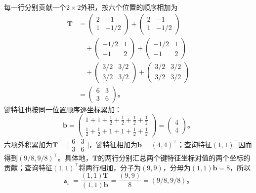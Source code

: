 每一行分别贡献一个$2\times2$外积，按六个位置的顺序相加为
\[
  \begin{aligned}
    \bm T
      &=\begin{pmatrix}2&-1\\1&-1/2\end{pmatrix}
        +\begin{pmatrix}2&-1\\1&-1/2\end{pmatrix}\\
      &\quad+\begin{pmatrix}-1/2&1\\-1&2\end{pmatrix}
        +\begin{pmatrix}-1/2&1\\-1&2\end{pmatrix}\\
      &\quad+\begin{pmatrix}3/2&3/2\\3/2&3/2\end{pmatrix}
        +\begin{pmatrix}3/2&3/2\\3/2&3/2\end{pmatrix}\\
      &=\begin{pmatrix}6&3\\3&6\end{pmatrix}\text{。}
  \end{aligned}
\]
键特征也按同一位置顺序逐坐标累加：
\[
  \bm b=
  \begin{pmatrix}
    1+1+\tfrac12+\tfrac12+\tfrac12+\tfrac12\\
    \tfrac12+\tfrac12+1+1+\tfrac12+\tfrac12
  \end{pmatrix}
  =\begin{pmatrix}4\\4\end{pmatrix}\text{。}
\]
六项外积累加为$\bm T=\bigl[\begin{smallmatrix}6&3\\3&6\end{smallmatrix}\bigr]$，键特征相加为$\bm b=(4,4)^{\top}$；查询特征$(1,1)^{\top}$因而得到$(9/8,9/8)^{\top}$。具体地，$\bm T$的两行分别汇总两个键特征坐标对值的两个坐标的贡献；查询特征$(1,1)^{\top}$将两行相加，分子为$(9,9)$，分母为$(1,1)\bm b=8$，所以
\[
  \bm z_i^{\top}
    =\frac{(1,1)\bm T}{(1,1)\bm b}
    =\frac{(9,9)}8
    =(9/8,9/8)\text{。}
\]

